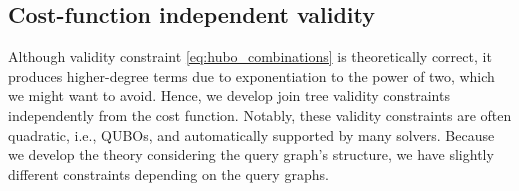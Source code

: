 \subsection{Cost-function independent validity}\label{subsubsection:cost_function_independent}

Although validity constraint \eqref{eq:hubo_combinations} is theoretically correct, it produces higher-degree terms due to exponentiation to the power of two, which we might want to avoid. Hence, we develop join tree validity constraints independently from the cost function. Notably, these validity constraints are often quadratic, i.e., QUBOs, and automatically supported by many solvers. Because we develop the theory considering the query graph's structure, we have slightly different constraints depending on the query graphs.


